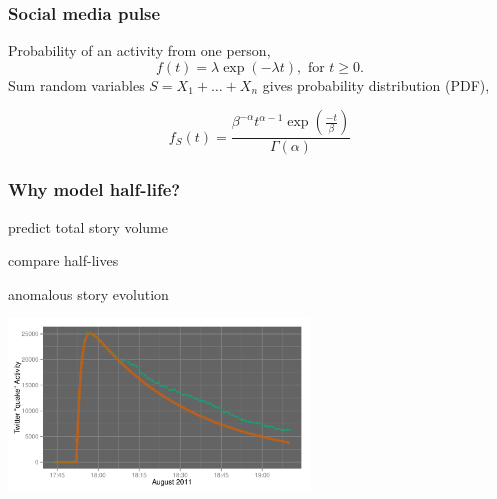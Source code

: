\documentclass{beamer}
\begin{document}
\begin{frame}
\frametitle{Social media pulse} 
\Large{Probability of an activity from one person,
\begin{equation*}
f(t) = \lambda \exp(-\lambda t), \text{ for } t \geq 0.
\end{equation*}
Sum random variables $S = X_1 + \ldots + X_{n}$ gives probability distribution (PDF),

\begin{equation*}
f_S(t) = \frac{ \beta^{-\alpha} t^{\alpha-1} \exp( \frac{-t}{\beta}) } {\Gamma(\alpha)}
\end{equation*}

%
}
\end{frame}



\begin{frame}\frametitle{Why model half-life?}
\begin{center}
\begin{itemize}
\Huge{
\item predict total story volume
\item compare half-lives
\item anomalous story evolution
}
\end{itemize}
\end{center}
\end{frame}


\begin{frame}
  \begin{center}
    \includegraphics[width=8cm]{./imgs/va_quake_fit1.pdf}
  \end{center}
\end{frame}
\end{document}
